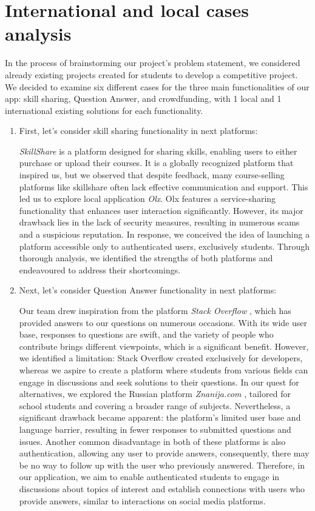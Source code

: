 \newpage
\section{International and local cases analysis} \label{intandloc}

In the process of brainstorming our project's problem statement, we considered already existing projects created for students to develop a competitive project. We decided to examine six different cases for the three main functionalities of our app: skill sharing, Question Answer, and crowdfunding, with 1 local and 1 international existing solutions for each functionality.

\begin{enumerate}
    \item First, let’s consider skill sharing functionality in next platforms:

     \textit{SkillShare} is a platform designed for sharing skills, enabling users to either purchase or upload their courses. It is a globally recognized platform that inspired us, but we observed that despite feedback, many course-selling platforms like skillshare often lack effective communication and support. This led us to explore local application \textit{Olx}. Olx \cite{olx} features a service-sharing functionality that enhances user interaction significantly. However, its major drawback lies in the lack of security measures, resulting in numerous scams and a suspicious reputation. In response, we conceived the idea of launching a platform accessible only to authenticated users, exclusively students. Through thorough analysis, we identified the strengths of both platforms and endeavoured to address their shortcomings.

     \item Next, let’s consider Question Answer functionality in next platforms:

     Our team drew inspiration from the platform \textit{Stack Overflow} \cite{stackoverlow}, which has provided answers to our questions on numerous occasions. With its wide user base, responses to questions are swift, and the variety of people who contribute brings different viewpoints, which is a significant benefit. However, we identified a limitation: Stack Overflow \cite{stackoverlow} created exclusively for developers, whereas we aspire to create a platform where students from various fields can engage in discussions and seek solutions to their questions. In our quest for alternatives, we explored the Russian platform \textit{Znanija.com} \cite{znanija}, tailored for school students and covering a broader range of subjects. Nevertheless, a significant drawback became apparent: the platform's limited user base and language barrier, resulting in fewer responses to submitted questions and issues. Another common disadvantage in both of these platforms is also authentication, allowing any user to provide answers, consequently, there may be no way to follow up with the user who previously answered. Therefore, in our application, we aim to enable authenticated students to engage in discussions about topics of interest and establish connections with users who provide answers, similar to interactions on social media platforms.


\end{enumerate}
